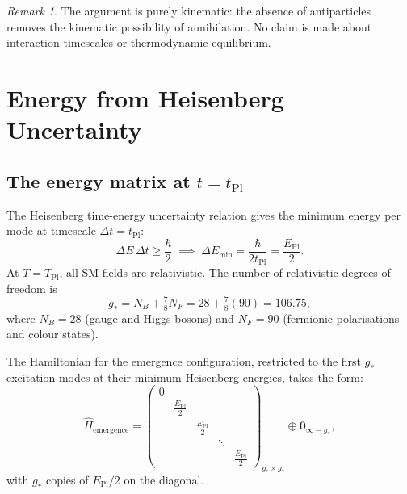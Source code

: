 \documentclass[12pt,a4paper]{article}
\theoremstyle{definition}
\theoremstyle{remark}
\newtheorem{remark}[theorem]{Remark}
\newcommand{\EPl}{E_{\mathrm{Pl}}}
\newcommand{\tPl}{t_{\mathrm{Pl}}}
\newcommand{\TPl}{T_{\mathrm{Pl}}}
\newcommand{\gstar}{g_{*}}
\newcommand{\Hhat}{\hat{H}}
\begin{document}
\begin{remark}
The argument is purely kinematic: the absence of antiparticles removes
the kinematic possibility of annihilation.
No claim is made about interaction timescales or thermodynamic equilibrium.
\end{remark}

\section{Energy from Heisenberg Uncertainty}
\label{sec:energy}

\subsection{The energy matrix at $t = \tPl$}

The Heisenberg time-energy uncertainty relation gives the minimum energy
per mode at timescale $\Delta t = \tPl$:
\begin{equation}\label{eq:heisenberg}
  \Delta E\,\Delta t \geq \frac{\hbar}{2}
  \;\implies\;
  \Delta E_{\min} = \frac{\hbar}{2\tPl} = \frac{\EPl}{2}.
\end{equation}
At $T = \TPl$, all SM fields are relativistic.
The number of relativistic degrees of freedom is
\begin{equation}\label{eq:gstar}
  \gstar = N_B + \tfrac{7}{8}N_F
  = 28 + \tfrac{7}{8}(90) = 106.75,
\end{equation}
where $N_B = 28$ (gauge and Higgs bosons) and $N_F = 90$ (fermionic
polarisations and colour states).

The Hamiltonian for the emergence configuration, restricted to the
first $\gstar$ excitation modes at their minimum Heisenberg energies,
takes the form:
\begin{equation}\label{eq:H_emergence}
  \Hhat_{\mathrm{emergence}}
  = \begin{pmatrix}
    0 & & & & \\
    & \frac{\EPl}{2} & & & \\
    & & \frac{\EPl}{2} & & \\
    & & & \ddots & \\
    & & & & \frac{\EPl}{2}
  \end{pmatrix}_{\gstar \times \gstar}
  \oplus \mathbf{0}_{\infty-\gstar},
\end{equation}
with $\gstar$ copies of $\EPl/2$ on the diagonal.
\end{document}

